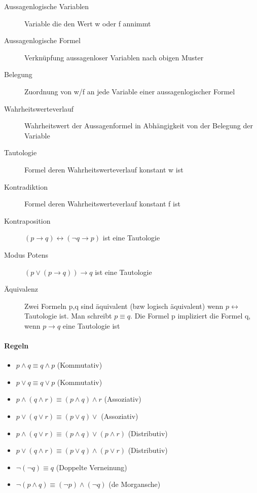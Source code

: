 \documentclass[a4paper]{article}
\begin{document}
\begin{multicols}{3}
    \begin{description}
        \item[Aussagenlogische Variablen] Variable die den Wert w oder f annimmt
        \item[Aussagenlogische Formel] Verknüpfung aussagenloser Variablen nach obigen Muster
        \item[Belegung] Zuordnung von w/f an jede Variable einer aussagenlogischer Formel
        \item[Wahrheitswerteverlauf] Wahrheitswert der Aussagenformel in Abhängigkeit von der Belegung der Variable
        \item[Tautologie] Formel deren Wahrheitswerteverlauf konstant w ist
        \item[Kontradiktion] Formel deren Wahrheitswerteverlauf konstant f ist
        \item[Kontraposition] $(p\rightarrow q)\leftrightarrow (\neg q \rightarrow p)$ ist eine Tautologie
        \item[Modus Potens] $(p\vee (p\rightarrow q))\rightarrow q$ ist eine Tautologie
        \item[Äquivalenz] Zwei Formeln p,q sind äquivalent (bzw logisch äquivalent) wenn $p\leftrightarrow$ Tautologie ist. Man schreibt $p \equiv q$. Die Formel p impliziert die Formel q, wenn $p\rightarrow q$ eine Tautologie ist
    \end{description}
    
    \paragraph{Regeln}
    \begin{itemize}
        \item $p\wedge q \equiv q \wedge p$ (Kommutativ)
        \item $p\vee q \equiv q \vee p$ (Kommutativ)
        \item $p\wedge (q \wedge r) \equiv (p \wedge q) \wedge r$ (Assoziativ)
        \item $p\vee ( q \vee r) \equiv (p \vee q) \vee$ (Assoziativ)
        \item $p\wedge (q\vee r) \equiv (p\wedge q) \vee (p\wedge r)$ (Distributiv)
        \item $p\vee (q\wedge r) \equiv (p\vee q) \wedge (p\vee r)$ (Distributiv)
        \item $\neg(\neg q) \equiv q$ (Doppelte Verneinung)
        \item $\neg(p\wedge q) \equiv (\neg p) \wedge (\neg q)$ (de Morgansche)
    \end{itemize}
    

\end{multicols}
\end{document}
